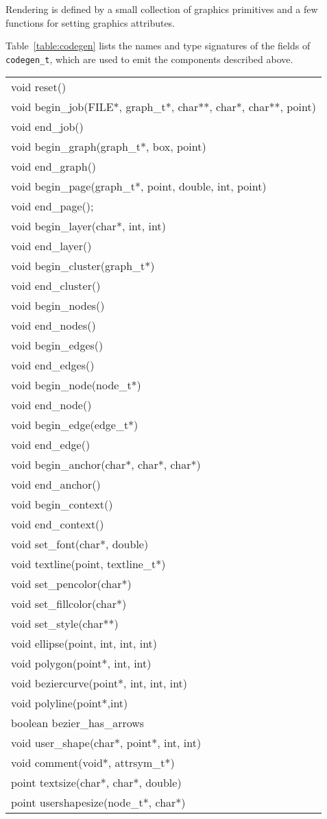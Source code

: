 Rendering is defined by a small
collection of graphics primitives and a few functions for setting graphics
attributes.

Table~\ref{table:codegen} lists the names and type signatures of
the fields of {\tt codegen\_t}, which are used to emit the components
described above.
\begin{table*}[htbp]
\centering
\begin{tabular}{|l|} \hline
void reset() \\
void begin\_job(FILE*, graph\_t*, char**, char*, char**, point) \\
void end\_job() \\
void begin\_graph(graph\_t*, box, point) \\
void end\_graph() \\
void begin\_page(graph\_t*, point, double, int, point) \\
void end\_page(); \\
void begin\_layer(char*, int, int) \\
void end\_layer() \\
void begin\_cluster(graph\_t*) \\
void end\_cluster() \\
void begin\_nodes() \\
void end\_nodes() \\
void begin\_edges() \\
void end\_edges() \\
void begin\_node(node\_t*) \\
void end\_node() \\
void begin\_edge(edge\_t*) \\
void end\_edge() \\
void begin\_anchor(char*, char*, char*) \\
void end\_anchor() \\
void begin\_context() \\
void end\_context() \\
void set\_font(char*, double) \\
void textline(point, textline\_t*) \\
void set\_pencolor(char*) \\
void set\_fillcolor(char*) \\
void set\_style(char**) \\
void ellipse(point, int, int, int) \\
void polygon(point*, int, int) \\
void beziercurve(point*, int, int, int) \\
void polyline(point*,int) \\
boolean bezier\_has\_arrows \\
void user\_shape(char*, point*, int, int) \\
void comment(void*, attrsym\_t*) \\
point textsize(char*, char*, double) \\
point usershapesize(node\_t*, char*) \\ \hline

\end{tabular}
\caption{Interface for a code generator}
\label{table:codegen}
\end{table*}
